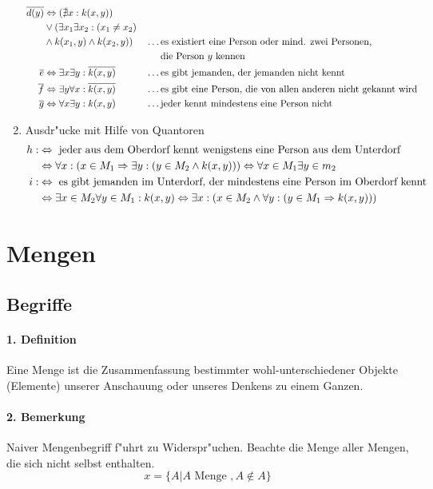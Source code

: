 \begin{enumerate}[label=\alph*)]
\begin{align*}
		\overline{d(y)}&\Leftrightarrow(\nexists x:k(x,y))\\
		&\lor(\exists x_1\exists x_2:(x_1\neq x_2)\\
		&\land k(x_1,y)\land k(x_2,y))&&\dots\text{es existiert eine Person oder mind. zwei Personen,}\\
		& &&\text{\enskip\enskip\enskip die Person }y\text{ kennen}\\
		\overline{e}&\Leftrightarrow\exists x\exists y:\overline{k(x,y)}&&\dots\text{es gibt jemanden, der jemanden nicht kennt}\\
		\overline{f}&\Leftrightarrow\exists y\forall x:\overline{k(x,y)}&&\dots\text{es gibt eine Person, die von allen anderen nicht gekannt wird}\\
		\overline{g}&\Leftrightarrow\forall x\exists y:k(x,y)&&\dots\text{jeder kennt mindestens eine Person nicht}
	\end{align*}
	\item Ausdr"ucke mit Hilfe von Quantoren
	\begin{align*}
		h:&\Leftrightarrow\text{ jeder aus dem Oberdorf kennt wenigstens eine Person aus dem Unterdorf}\\
		&\Leftrightarrow\forall x:(x\in M_1\Rightarrow\exists y:(y\in M_2\land k(x,y)))\Leftrightarrow\forall x\in M_1\exists y\in m_2\\
		i:&\Leftrightarrow\text{ es gibt jemanden im Unterdorf, der mindestens eine Person im Oberdorf kennt}\\
		&\Leftrightarrow\exists x\in M_2\forall y\in M_1:k(x,y)\Leftrightarrow\exists x:(x\in M_2\land\forall y:(y\in M_1\Rightarrow k(x,y)))
	\end{align*}
\end{enumerate}

\section{Mengen}
\subsection{Begriffe}

\paragraph{1. Definition} \parskp
Eine Menge ist die Zusammenfassung bestimmter wohl-unterschiedener Objekte (Elemente) unserer Anschauung oder unseres Denkens zu einem Ganzen.

\paragraph{2. Bemerkung} Naiver Mengenbegriff f"uhrt zu Widerspr"uchen. \newline
Beachte die Menge aller Mengen, die sich nicht selbst enthalten.
\[
x=\{A|A\text{ Menge },A\notin A\}
\]

